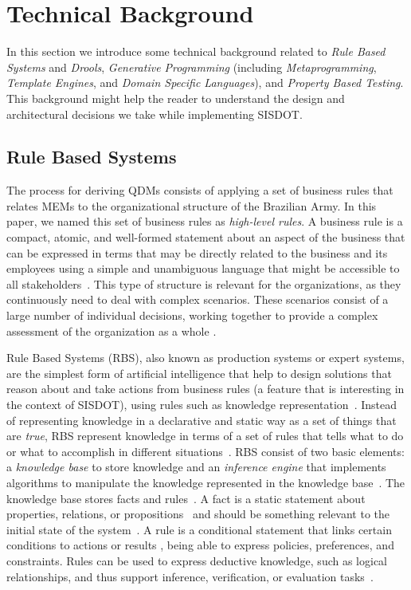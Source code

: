\documentclass[twocolumn]{bmcart}%
\newcommand{\callers}{\emph{high-level rules}\xspace}
\begin{document}
\section{Technical Background}
\label{back}


In this section we
introduce some technical background related to \emph{Rule Based Systems} and
\emph{Drools}, \emph{Generative Programming} (including \emph{Metaprogramming},
\emph{Template Engines}, and \emph{Domain Specific Languages}), and
\emph{Property Based Testing}. This background might help the reader to
understand the design and architectural decisions we take
while implementing SISDOT.  
\subsection{Rule Based Systems}
\label{sec:rbs}
The process for deriving QDMs consists of applying a set of business rules that relates MEMs to the organizational structure of the Brazilian Army. In this paper, we named this set of business rules as \callers. A business rule is a compact, atomic, and well-formed statement about an aspect of the business that can be expressed in terms that may be directly related to the business and its employees using a simple and unambiguous language that might be accessible to all stakeholders~\cite{graham2007business}. This type of structure is relevant for the organizations, as they continuously need to deal with complex scenarios. These scenarios consist of a large number of individual decisions, working together to provide a complex assessment of the organization as a whole \cite{salatino2016mastering}.

Rule Based Systems (RBS), also known as production systems or expert systems, are the simplest form of artificial intelligence that help to design solutions that reason about and take actions from business rules (a feature that is interesting in the context of SISDOT), using rules such as knowledge representation~\cite{grosan2011}. Instead of representing knowledge in a declarative and static way as a set of things that are \emph{true}, RBS represent knowledge in terms of a set of rules that tells what to do or what to accomplish in different situations~\cite{grosan2011}. RBS consist of two basic elements: a \emph{knowledge base} to store knowledge and an \emph{inference engine} that implements  algorithms to manipulate the knowledge represented in the knowledge base~\cite{grosan2011,DBLP:books/daglib/0070547,gallacher1989}. The knowledge base stores facts and rules~\cite{DBLP:journals/cacm/Hayes-Roth85}. A fact is a static statement about properties, relations, or propositions~\cite{DBLP:journals/cacm/Hayes-Roth85} and should be something relevant to the initial state of the system~\cite{grosan2011}. A rule is a conditional statement that links certain conditions to actions or results \cite{abraham2005}, being able to express policies, preferences, and constraints. Rules can be used to express deductive knowledge, such as logical relationships, and thus support inference, verification, or evaluation tasks~\cite{DBLP:journals/cacm/Hayes-Roth85}.
\end{document}
